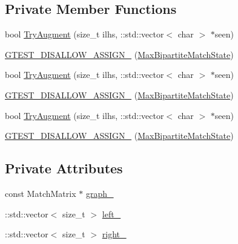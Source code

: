 \subsection*{Private Member Functions}
\begin{DoxyCompactItemize}
\item 
bool \mbox{\hyperlink{classtesting_1_1internal_1_1_max_bipartite_match_state_a8aa8dc82be659772a1dd68eb00d7a858}{Try\+Augment}} (size\+\_\+t ilhs, \+::std\+::vector$<$ char $>$ $\ast$seen)
\item 
\mbox{\hyperlink{classtesting_1_1internal_1_1_max_bipartite_match_state_a633fb7cfb6634dbbb1b62637efc540f8}{G\+T\+E\+S\+T\+\_\+\+D\+I\+S\+A\+L\+L\+O\+W\+\_\+\+A\+S\+S\+I\+G\+N\+\_\+}} (\mbox{\hyperlink{classtesting_1_1internal_1_1_max_bipartite_match_state}{Max\+Bipartite\+Match\+State}})
\item 
bool \mbox{\hyperlink{classtesting_1_1internal_1_1_max_bipartite_match_state_a8aa8dc82be659772a1dd68eb00d7a858}{Try\+Augment}} (size\+\_\+t ilhs, \+::std\+::vector$<$ char $>$ $\ast$seen)
\item 
\mbox{\hyperlink{classtesting_1_1internal_1_1_max_bipartite_match_state_a633fb7cfb6634dbbb1b62637efc540f8}{G\+T\+E\+S\+T\+\_\+\+D\+I\+S\+A\+L\+L\+O\+W\+\_\+\+A\+S\+S\+I\+G\+N\+\_\+}} (\mbox{\hyperlink{classtesting_1_1internal_1_1_max_bipartite_match_state}{Max\+Bipartite\+Match\+State}})
\item 
bool \mbox{\hyperlink{classtesting_1_1internal_1_1_max_bipartite_match_state_a8aa8dc82be659772a1dd68eb00d7a858}{Try\+Augment}} (size\+\_\+t ilhs, \+::std\+::vector$<$ char $>$ $\ast$seen)
\item 
\mbox{\hyperlink{classtesting_1_1internal_1_1_max_bipartite_match_state_a633fb7cfb6634dbbb1b62637efc540f8}{G\+T\+E\+S\+T\+\_\+\+D\+I\+S\+A\+L\+L\+O\+W\+\_\+\+A\+S\+S\+I\+G\+N\+\_\+}} (\mbox{\hyperlink{classtesting_1_1internal_1_1_max_bipartite_match_state}{Max\+Bipartite\+Match\+State}})
\end{DoxyCompactItemize}
\subsection*{Private Attributes}
\begin{DoxyCompactItemize}
\item 
const Match\+Matrix $\ast$ \mbox{\hyperlink{classtesting_1_1internal_1_1_max_bipartite_match_state_a2100d418a1dbebc6b838875bc7d91ed6}{graph\+\_\+}}
\item 
\+::std\+::vector$<$ size\+\_\+t $>$ \mbox{\hyperlink{classtesting_1_1internal_1_1_max_bipartite_match_state_a653a0dca923e4ff07f7282e879036fdd}{left\+\_\+}}
\item 
\+::std\+::vector$<$ size\+\_\+t $>$ \mbox{\hyperlink{classtesting_1_1internal_1_1_max_bipartite_match_state_a29e2fc00f14f6e58d87074eb33e2eb76}{right\+\_\+}}
\end{DoxyCompactItemize}
